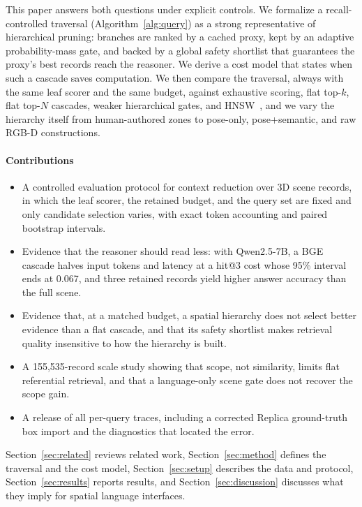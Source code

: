 \documentclass{ieeeaccess}
\begin{document}
This paper answers both questions under explicit controls. We formalize a
recall-controlled traversal (Algorithm~\ref{alg:query}) as a strong
representative of hierarchical pruning: branches are ranked by a cached proxy,
kept by an adaptive probability-mass gate, and backed by a global safety
shortlist that guarantees the proxy's best records reach the reasoner. We derive
a cost model that states when such a cascade saves computation. We then compare
the traversal, always with the same leaf scorer and the same budget, against
exhaustive scoring, flat top-$k$, flat top-$N$ cascades, weaker hierarchical
gates, and HNSW~\cite{hnsw2020}, and we vary the hierarchy itself from
human-authored zones to pose-only, pose+semantic, and raw RGB-D constructions.

\paragraph{Contributions}
\begin{itemize}
\item A controlled evaluation protocol for context reduction over 3D scene
records, in which the leaf scorer, the retained budget, and the query set are
fixed and only candidate selection varies, with exact token accounting and
paired bootstrap intervals.
\item Evidence that the reasoner should read less: with Qwen2.5-7B, a BGE
cascade halves input tokens and latency at a hit@3 cost whose 95\% interval
ends at 0.067, and three retained records yield higher answer accuracy than the
full scene.
\item Evidence that, at a matched budget, a spatial hierarchy does not select
better evidence than a flat cascade, and that its safety shortlist makes
retrieval quality insensitive to how the hierarchy is built.
\item A 155,535-record scale study showing that scope, not similarity, limits
flat referential retrieval, and that a language-only scene gate does not recover
the scope gain.
\item A release of all per-query traces, including a corrected Replica
ground-truth box import and the diagnostics that located the error.
\end{itemize}

Section~\ref{sec:related} reviews related work, Section~\ref{sec:method} defines
the traversal and the cost model, Section~\ref{sec:setup} describes the data and
protocol, Section~\ref{sec:results} reports results, and
Section~\ref{sec:discussion} discusses what they imply for spatial language
interfaces.
\end{document}
